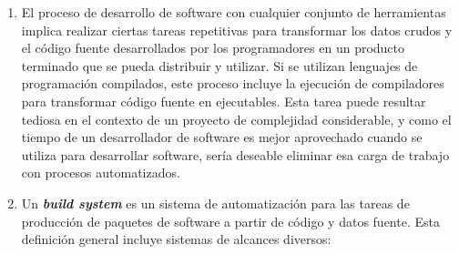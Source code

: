 \documentclass[]{article}
\begin{document}
\begin{enumerate}[1.]
\item
  El proceso de desarrollo de software con cualquier conjunto de
  herramientas implica realizar ciertas tareas repetitivas para
  transformar los datos crudos y el código fuente desarrollados por los
  programadores en un producto terminado que se pueda distribuir y
  utilizar. Si se utilizan lenguajes de programación compilados, este
  proceso incluye la ejecución de compiladores para transformar código
  fuente en ejecutables. Esta tarea puede resultar tediosa en el
  contexto de un proyecto de complejidad considerable, y como el tiempo
  de un desarrollador de software es mejor aprovechado cuando se utiliza
  para desarrollar software, sería deseable eliminar esa carga de
  trabajo con procesos automatizados.
\item
  Un \textbf{\emph{build system}} es un sistema de automatización para
  las tareas de producción de paquetes de software a partir de código y
  datos fuente. Esta definición general incluye sistemas de alcances
  diversos:


\end{enumerate}
\end{document}
